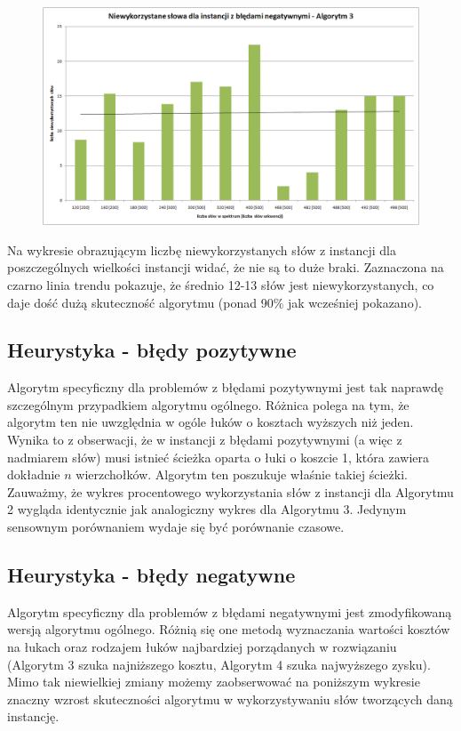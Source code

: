 \documentclass[a4paper,10pt]{article}
\begin{document}
\begin{figure}[h]
  \footnotesize\centering
  \includegraphics[width=\textwidth,keepaspectratio]{unusedWords_general_negative.png}
\end{figure}

Na wykresie obrazującym liczbę niewykorzystanych słów z instancji dla poszczególnych wielkości instancji widać, że nie są to duże braki. Zaznaczona na czarno linia trendu pokazuje, że średnio 12-13 słów jest niewykorzystanych, co daje dość dużą skuteczność algorytmu (ponad 90\% jak wcześniej pokazano).

\subsection{Heurystyka - błędy pozytywne}

Algorytm specyficzny dla problemów z błędami pozytywnymi jest tak naprawdę szczególnym przypadkiem algorytmu ogólnego. Różnica polega na tym, że algorytm ten nie uwzględnia w ogóle łuków o kosztach wyższych niż jeden. Wynika to z obserwacji, że w instancji z błędami pozytywnymi (a więc z nadmiarem słów) musi istnieć ścieżka oparta o łuki o koszcie 1, która zawiera dokładnie $n$ wierzchołków. Algorytm ten poszukuje właśnie takiej ścieżki. Zauważmy, że wykres procentowego wykorzystania słów z instancji dla Algorytmu 2 wygląda identycznie jak analogiczny wykres dla Algorytmu 3. Jedynym sensownym porównaniem wydaje się być porównanie czasowe.

\subsection{Heurystyka - błędy negatywne}

Algorytm specyficzny dla problemów z błędami negatywnymi jest zmodyfikowaną wersją algorytmu ogólnego. Różnią się one metodą wyznaczania wartości kosztów na łukach oraz rodzajem łuków najbardziej porządanych w rozwiązaniu (Algorytm 3 szuka najniższego kosztu, Algorytm 4 szuka najwyższego zysku). Mimo tak niewielkiej zmiany możemy zaobserwować na poniższym wykresie znaczny wzrost skuteczności algorytmu w wykorzystywaniu słów tworzących daną instancję.
\end{document}
